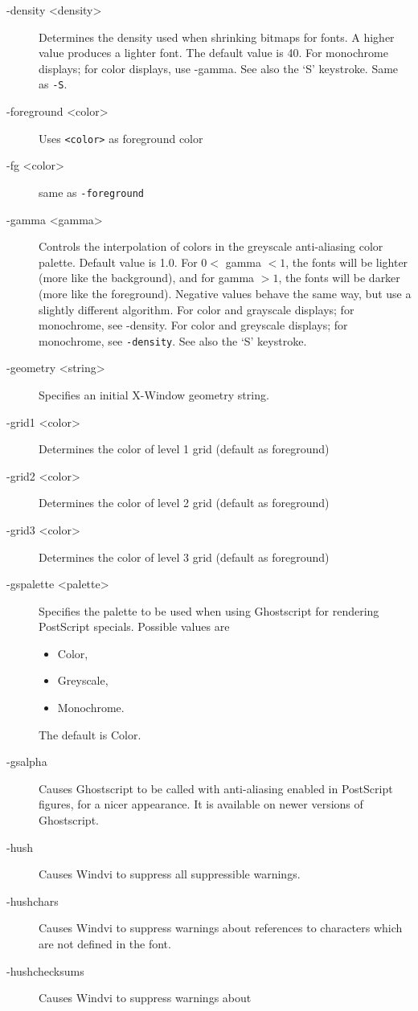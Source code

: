 \documentclass[a4paper,11pt]{article}
\def\WDVI{\textsf{Windvi}}
\begin{document}
\begin{description}
\item[-density <density>] Determines the density used when shrinking
  bitmaps for fonts.  A higher value produces a lighter font.  The
  default value is 40.  For monochrome displays; for color displays,
  use -gamma.  See also the `S' keystroke. Same as \texttt{-S}.
\item[-foreground <color>] Uses \texttt{<color>} as foreground color
\item[-fg <color>] same as \texttt{-foreground} 
\item[-gamma <gamma>]   Controls the interpolation  of  colors  in the
  greyscale anti-aliasing color palette.  Default  value is 1.0.   For
  $0  < $  gamma $ <   1$, the fonts will  be  lighter (more  like the
  background), and for gamma  $ > 1$, the  fonts will be  darker (more
  like the foreground).  Negative values behave the  same way, but use
  a slightly different   algorithm. For color and  grayscale displays;
  for monochrome, see -density. For color  and greyscale displays; for
  monochrome, see \texttt{-density}. See also the `S' keystroke.
\item[-geometry <string>] Specifies an initial X-Window geometry string.
\item[-grid1 <color>] Determines the color of level 1 grid (default as
  foreground)
\item[-grid2 <color>] Determines the color of level 2 grid (default as
  foreground)
\item[-grid3 <color>] Determines the color of level 3 grid (default as
  foreground)
\item[-gspalette <palette>] Specifies the palette to be used when using Ghostscript for rendering
PostScript specials.  Possible values are
\begin{itemize}
\item Color,
\item Greyscale,
\item Monochrome.
\end{itemize}
The default is Color.
\item[-gsalpha]  Causes Ghostscript  to  be called with  anti-aliasing
  enabled   in  PostScript figures,  for  a  nicer  appearance.  It is
  available on newer versions of Ghostscript.
\item[-hush] Causes \WDVI{} to suppress all suppressible warnings.
\item[-hushchars] Causes \WDVI{} to suppress warnings about references
  to characters which are not defined in the font.
\item[-hushchecksums] Causes \WDVI{} to suppress warnings about

\end{description}
\end{document}

